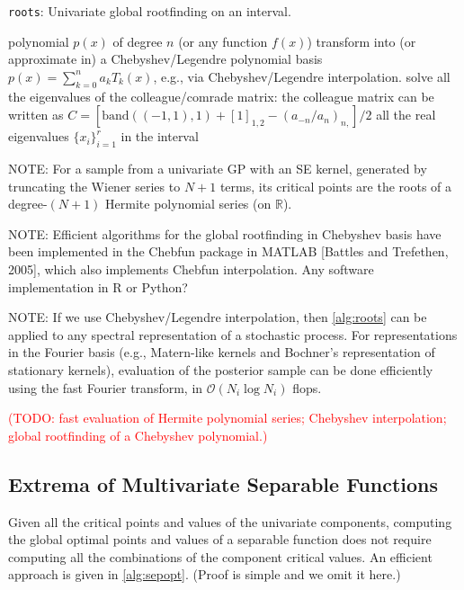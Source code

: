 \documentclass{article}
\newcommand{\todo}[1]{\textcolor{red}{(#1)}}
\begin{document}
\begin{algorithm}[h]
  \caption{\texttt{roots}: Univariate global rootfinding on an interval.}
  \label{alg:roots}
  \begin{algorithmic}[1] %
    \Input polynomial $p(x)$ of degree $n$ (or any function $f(x)$)
    \State transform into (or approximate in) a Chebyshev/Legendre polynomial basis\newline
    $p(x) = \sum_{k=0}^n a_k T_k(x)$, e.g., via Chebyshev/Legendre interpolation.
    \State solve all the eigenvalues of the colleague/comrade matrix:\newline
    the colleague matrix can be written as
    $C = [\mathrm{band}((-1, 1), 1) + [1]_{1,2} - (a_{-n} / a_n)_{n,}] / 2$
    \Output all the real eigenvalues $\{x_i\}_{i=1}^r$ in the interval
  \end{algorithmic}
\end{algorithm}

NOTE: For a sample from a univariate GP with an SE kernel, generated by
truncating the Wiener series to $N+1$ terms, its critical points are
the roots of a degree-$(N+1)$ Hermite polynomial series (on
$\mathbb{R}$).

NOTE: Efficient algorithms for the global rootfinding in Chebyshev basis
have been implemented in the Chebfun package in MATLAB [Battles and
Trefethen, 2005], which also implements Chebfun
interpolation. Any software implementation in R or Python?

NOTE: If we use Chebyshev/Legendre interpolation,
then \cref{alg:roots} can be applied to any spectral representation of a stochastic process.
For representations in the Fourier basis
(e.g., Matern-like kernels and Bochner's representation of stationary kernels),
evaluation of the posterior sample can be done efficiently using the fast Fourier transform,
in $\mathcal{O}(N_i \log N_i)$ flops.

\todo{TODO: fast evaluation of Hermite polynomial series; Chebyshev
interpolation; global rootfinding of a Chebyshev polynomial.}

\subsection{Extrema of Multivariate Separable Functions}

Given all the critical points and values of the univariate components,
computing the global optimal points and values of a separable function
does not require computing all the combinations of the component
critical values. An efficient approach is given in \cref{alg:sepopt}. (Proof is
simple and we omit it here.)
\end{document}
